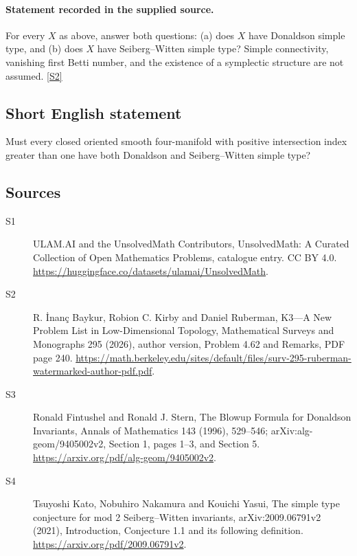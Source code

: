 \documentclass[11pt]{article}
\newcommand{\sref}[2]{\hyperlink{source:#1:#2}{[S#2]}}
\begin{document}
\paragraph{Statement recorded in the supplied source.}
For every $X$ as above, answer both questions: (a) does $X$ have Donaldson simple type, and (b) does $X$ have Seiberg--Witten simple type? Simple connectivity, vanishing first Betti number, and the existence of a symplectic structure are not assumed. \sref{statement}{2}
\subsection{Short English statement}
Must every closed oriented smooth four-manifold with positive intersection index greater than one have both Donaldson and Seiberg–Witten simple type?
\subsection{Sources}
\begin{description}
\item[\hypertarget{source:statement:1}{S1}] ULAM.AI and the UnsolvedMath Contributors, UnsolvedMath: A Curated Collection of Open Mathematics Problems, catalogue entry. CC BY 4.0. \url{https://huggingface.co/datasets/ulamai/UnsolvedMath}.
\item[\hypertarget{source:statement:2}{S2}] R. İnanç Baykur, Robion C. Kirby and Daniel Ruberman, K3—A New Problem List in Low-Dimensional Topology, Mathematical Surveys and Monographs 295 (2026), author version, Problem 4.62 and Remarks, PDF page 240. \url{https://math.berkeley.edu/sites/default/files/surv-295-ruberman-watermarked-author-pdf.pdf}.
\item[\hypertarget{source:statement:3}{S3}] Ronald Fintushel and Ronald J. Stern, The Blowup Formula for Donaldson Invariants, Annals of Mathematics 143 (1996), 529--546; arXiv:alg-geom/9405002v2, Section 1, pages 1--3, and Section 5. \url{https://arxiv.org/pdf/alg-geom/9405002v2}.
\item[\hypertarget{source:statement:4}{S4}] Tsuyoshi Kato, Nobuhiro Nakamura and Kouichi Yasui, The simple type conjecture for mod 2 Seiberg–Witten invariants, arXiv:2009.06791v2 (2021), Introduction, Conjecture 1.1 and its following definition. \url{https://arxiv.org/pdf/2009.06791v2}.
\end{description}
\label{end:statement}
\end{document}
